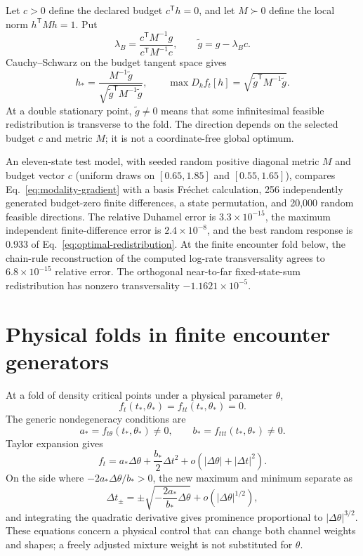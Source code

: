 \documentclass[aps,pre,reprint,amsmath,amssymb,longbibliography,floatfix]{revtex4-2}
\begin{document}
Let \(c>0\) define the declared budget \(c^\mathsf Th=0\), and let
\(M\succ0\) define the local norm \(h^\mathsf TMh=1\). Put
\begin{equation}
\lambda_B=\frac{c^\mathsf TM^{-1}g}{c^\mathsf TM^{-1}c},
\qquad \widetilde g=g-\lambda_Bc.
\label{eq:budget-projection}
\end{equation}
Cauchy--Schwarz on the budget tangent space gives
\begin{equation}
h_*=\frac{M^{-1}\widetilde g}
{\sqrt{\widetilde g^\mathsf TM^{-1}\widetilde g}},
\qquad
\max D_kf_t[h]=\sqrt{\widetilde g^\mathsf TM^{-1}\widetilde g}.
\label{eq:optimal-redistribution}
\end{equation}
At a double stationary point, \(\widetilde g\ne0\) means that some
infinitesimal feasible redistribution is transverse to the fold. The
direction depends on the selected budget \(c\) and metric \(M\); it is not a
coordinate-free global optimum.

An eleven-state test model, with seeded random positive diagonal metric
\(M\) and budget vector \(c\) (uniform draws on \([0.65,1.85]\) and
\([0.55,1.65]\)), compares Eq.~\eqref{eq:modality-gradient} with a
basis Fr\'echet calculation, 256 independently generated budget-zero finite differences, a
state permutation, and 20,000 random feasible directions. The relative
Duhamel error is \(3.3\times10^{-15}\), the maximum independent finite-difference
error is \(2.4\times10^{-8}\), and the best random response is \(0.933\) of
Eq.~\eqref{eq:optimal-redistribution}. At the finite encounter fold below,
the chain-rule reconstruction of the computed log-rate transversality agrees
to \(6.8\times10^{-15}\) relative error. The orthogonal near-to-far
fixed-state-sum redistribution has nonzero transversality
\(-1.1621\times10^{-5}\).

\section{Physical folds in finite encounter generators}
\label{sec:fold-results}

At a fold of density critical points under a physical parameter \(\theta\),
\begin{equation}
f_t(t_*,\theta_*)=f_{tt}(t_*,\theta_*)=0.
\label{eq:physical-fold}
\end{equation}
The generic nondegeneracy conditions are
\begin{equation}
a_*=f_{t\theta}(t_*,\theta_*)\ne0,\qquad
b_*=f_{ttt}(t_*,\theta_*)\ne0.
\label{eq:fold-nondegenerate}
\end{equation}
Taylor expansion gives
\[
f_t=a_*\Delta\theta+\frac{b_*}{2}\Delta t^2+
o(|\Delta\theta|+|\Delta t|^2).
\]
On the side where \(-2a_*\Delta\theta/b_*>0\), the new maximum and minimum
separate as
\begin{equation}
\Delta t_\pm=
\pm\sqrt{-\frac{2a_*}{b_*}\Delta\theta}
+o(|\Delta\theta|^{1/2}),
\label{eq:fold-roots}
\end{equation}
and integrating the quadratic derivative gives prominence proportional to
\(|\Delta\theta|^{3/2}\). These equations concern a physical control that can
change both channel weights and shapes; a freely adjusted mixture weight is
not substituted for \(\theta\).
\end{document}
